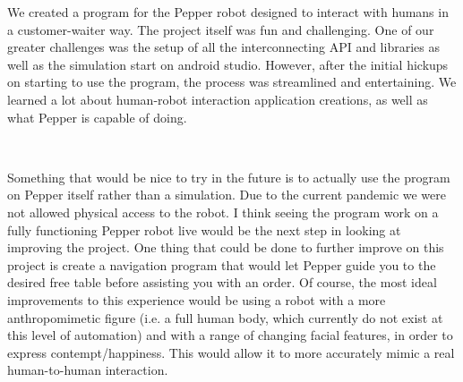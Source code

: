 \documentclass[12pt, letterpaper, twoside]{article}
\begin{document}
We created a program for the Pepper robot designed to interact with humans in a customer-waiter way. The project itself was fun and challenging. One of our greater challenges was the setup of all the interconnecting API and libraries as well as the simulation start on android studio. However, after the initial hickups on starting to use the program, the process was streamlined and entertaining. We learned a lot about human-robot interaction application creations, as well as what Pepper is capable of doing. 

\

Something that would be nice to try in the future is to actually use the program on Pepper itself rather than a simulation. Due to the current pandemic we were not allowed physical access to the robot. I think seeing the program work on a fully functioning Pepper robot live would be the next step in looking at improving the project. One thing that could be done to further improve on this project is create a navigation program that would let Pepper guide you to the desired free table before assisting you with an order. Of course, the most ideal improvements to this experience would be using a robot with a more anthropomimetic figure (i.e. a full human body, which currently do not exist at this level of automation) and with a range of changing facial features, in order to express contempt/happiness. This would allow it to more accurately mimic a real human-to-human interaction.  

\




\newpage

\nocite{*}
\printbibliography[heading=bibintoc,title={References}]
\end{document}
